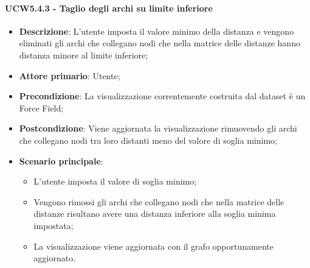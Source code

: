 \paragraph{UCW5.4.3 - Taglio degli archi su limite inferiore}
\label{par:ucw5.4.3}
\begin{itemize}
    \item \textbf{Descrizione}:     L'utente imposta il valore minimo della distanza e vengono eliminati gli archi che collegano nodi che nella matrice delle distanze hanno distanza minore al limite inferiore;
    \item \textbf{Attore primario}: Utente;
    \item \textbf{Precondizione}:   La visualizzazione correntemente costruita dal dataset è un Force Field;
    \item \textbf{Postcondizione}:  Viene aggiornata la visualizzazione rimuovendo gli archi  che collegano nodi tra loro distanti meno del valore di soglia minimo;
    \item \textbf{Scenario principale}:
          \begin{itemize}
              \item L'utente imposta il valore di soglia minimo;
              \item Vengono rimossi gli archi che collegano nodi che nella matrice delle distanze risultano avere una distanza inferiore alla soglia minima impostata;
              \item La visualizzazione viene aggiornata con il grafo opportunamente aggiornato.
          \end{itemize}
\end{itemize}

